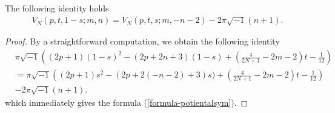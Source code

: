\documentclass[12pt]{amsart}
\begin{document}
\begin{lemma}
The following identity holds
    \begin{align} \label{formula-potientalsym}
          V_{N}(p,t,1-s;m,n)
          =V_{N}(p,t,s;m,-n-2)-2\pi \sqrt{-1}(n+1). 
    \end{align}
\end{lemma}
\begin{proof}
    By a straightforward computation, we obtain the following identity
    \begin{align}
        &\pi\sqrt{-1}\left((2p+1)(1-s)^2-(2p+2n+3)(1-s)+\left(\frac{4}{2N+1}-2m-2\right)t-\frac{1}{12}\right)\\\nonumber
        &=\pi\sqrt{-1}\left((2p+1)s^2-(2p+2(-n-2)+3)s)+\left(\frac{4}{2N+1}-2m-2\right)t-\frac{1}{12}\right)\\\nonumber
        &-2\pi \sqrt{-1}(n+1).
    \end{align}
    which immediately gives the formula (\ref{formula-potientalsym}).
\end{proof}
\end{document}
